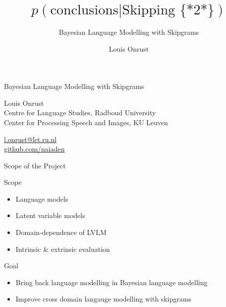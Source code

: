 \author{Louis Onrust}
\title{$p(\text{conclusions} | \text{Skipping \{*2*\}})$}
\subtitle{Bayesian Language Modelling with Skipgrams}
\date{}


\begin{frame}
    \titlepage
\end{frame}
\note[itemize]{
}

\begin{frame}{Bayesian Language Modelling with Skipgrams}
    \begin{block}{}
        Louis Onrust \\
        Centre for Language Studies, Radboud University \\
        Center for Processing Speech and Images, KU Leuven
    \end{block}

    \begin{block}{}
        \href{mailto:l.onrust@let.ru.nl}{l.onrust@let.ru.nl} \\
        \href{https://github.com/naiaden}{github.com/naiaden}
    \end{block}
\end{frame}
\note[itemize]{
}

\begin{frame}{Scope of the Project}
    \begin{block}{Scope}
        \begin{itemize}
            \item Language models
            \item Latent variable models
            \item Domain-dependence of LVLM
            \item Intrinsic \& extrinsic evaluation
        \end{itemize}
    \end{block}

    \begin{block}{Goal}
        \begin{itemize}
            \item Bring back language modelling in Bayesian language modelling
            \item Improve cross domain langauge modelling with skipgrams
        \end{itemize}
    \end{block}
\end{frame}
\note[itemize]{
}

